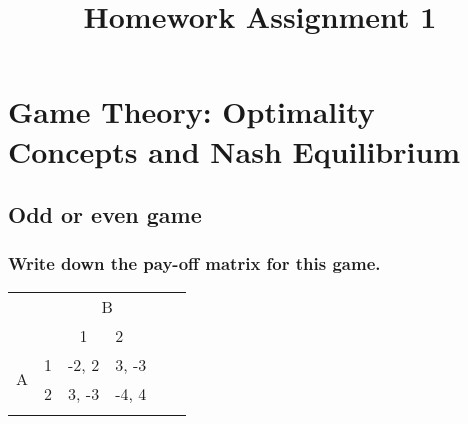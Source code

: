 \documentclass[11pt]{article}
\title{Homework Assignment 1}
\begin{document}
    \maketitle


    \section{Game Theory: Optimality Concepts and Nash Equilibrium}

    \subsection{Odd or even game}

    \subsubsection{Write down the pay-off matrix for this game.}
    \begin{table}[h]
        \centering
        \begin{tabular}{llllll}
            & & \multicolumn{2}{c}{B} & & \\
            &                        & \multicolumn{1}{c}{1}      & 2                          & & \\ \cline{3-4}
            \multirow{2}{*}{A} & \multicolumn{1}{r|}{1} & \multicolumn{1}{l|}{-2, 2} & \multicolumn{1}{l|}{3, -3} &  &  \\ \cline{3-4}
            & \multicolumn{1}{l|}{2} & \multicolumn{1}{l|}{3, -3} & \multicolumn{1}{l|}{-4, 4} & & \\ \cline{3-4}
            &                        &                            &                            & &
        \end{tabular}
    \end{table}
\end{document}
